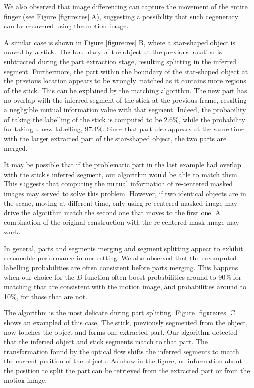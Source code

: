 \documentclass{article}
\begin{document}
We also observed that image differencing can capture the movement of the entire finger (see Figure \ref{figure:res} A), suggesting a possibility that such degeneracy can be recovered using the motion image. 

A similar case is shown in Figure \ref{figure:res} B, where a star-shaped object is moved by a stick. The boundary of the object at the previous location is subtracted during the part extraction stage, resulting splitting in the inferred segment. Furthermore, the part within the boundary of the star-shaped object at the previous location appears to be wrongly matched as it contains more regions of the stick. This can be explained by the matching algorithm. The new part has no overlap with the inferred segment of the stick at the previous frame, resulting a negligible mutual information value with that segment. Indeed, the probability of taking the labelling of the stick is computed to be 2.6\%, while the probability for taking a new labelling, 97.4\%. Since that part also appears at the same time with the larger extracted part of the star-shaped object, the two parts are merged.

It may be possible that if the problematic part in the last example had overlap with the stick's inferred segment, our algorithm would be able to match them. This suggests that computing the mutual information of re-centered masked images may served to solve this problem. However, if two identical objects are in the scene, moving at different time, only using re-centered masked image may drive the algorithm match the second one that moves to the first one. A combination of the original construction with the re-centered mask image may work. 

In general, parts and segments merging and segment splitting appear to exhibit reasonable performance in our setting. We also observed that the recomputed labelling probabilities are often consistent before parts merging. This happens when our choice for the $D$ function often boost probabilities around to 90\% for matching that are consistent with the motion image, and probabilities around to 10\%, for those that are not.

The algorithm is the most delicate during part splitting. Figure \ref{figure:res} C shows an exampled of this case. The stick, previously segmented from the object, now touches the object and forms one extracted part. Our algorithm detected that the inferred object and stick segments match to that part. The transformation found by the optical flow shifts the inferred segments to match the current position of the objects. As show in the figure, no information about the position to split the part can be retrieved from the extracted part or from the motion image. 
\end{document}
